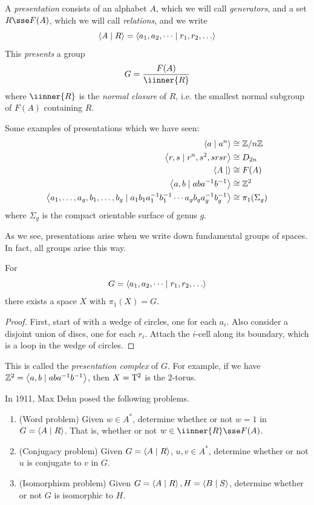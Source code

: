\documentclass{article}
\begin{document}
A \emph{presentation} consists of an alphabet \(A\), which we will call \emph{generators}, and a set \(R \sse F(A)\), which we will call \emph{relations}, and we write
\[\inner{A \mid R} = \inner{a_1, a_2, \dots \mid r_1, r_2, \dots}\]
This \emph{presents}  a group
\[G = \frac{F(A)}{\iinner{R}}\]
where \(\iinner{R}\) is the \emph{normal closure} of \(R\), i.e. the smallest normal subgroup of \(F(A)\) containing \(R\).

\begin{example}
    Some examples of presentations which we have seen:
    \begin{align*}
        \left\langle a \mid a^n \right\rangle &\cong \mathbb{Z}/n\mathbb{Z} \\
        \left\langle r, s \mid r^n, s^2, srsr \right\rangle &\cong D_{2n} \\
        \left\langle A\mid \right\rangle &\cong F(A) \\
        \left\langle a, b \mid aba^{-1}b^{-1} \right\rangle &\cong \mathbb{Z}^2 \\
        \left\langle a_1, \dots, a_g, b_1, \dots, b_g \mid a_1b_1a_1^{-1}b_1^{-1}\cdots a_gb_ga_g^{-1}b_g^{-1} \right\rangle &\cong \pi_1(\Sigma_g)
    \end{align*}
    where \(\Sigma_g\) is the compact orientable surface of genus \(g\).
\end{example}
As we see, presentations arise when we write down fundamental groups of spaces. In fact, all groups arise this way.
\begin{corollary}
    For
    \[G = \inner{a_1, a_2, \dots \mid r_1, r_2, \dots}\]
    there exists a space \(X\) with \(\pi_1(X) = G\).
\end{corollary}

\begin{proof}
    First, start of with a wedge of circles, one for each \(a_i\). Also consider a disjoint union of discs, one for each \(r_i\). Attach the \(i\)-cell along its boundary, which is a loop in the wedge of circles.
\end{proof}

This is called the \emph{presentation complex} of \(G\). For example, if we have \(\mathbb{Z}^2 = \left\langle a, b \mid aba^{-1}b^{-1} \right\rangle\), then \(X = \mathrm{T}^2\) is the \(2\)-torus.

In 1911, Max Dehn posed the following problems.
\begin{enumerate}
    \item (Word problem) Given \(w \in A^*\), determine whether or not \(w = 1\) in \(G = \left\langle A \mid R \right\rangle\). That is, whether or not \(w \in \iinner{R} \sse F(A)\).
    \item (Conjugacy problem) Given \(G = \left\langle A \mid R \right\rangle\), \(u, v \in A^*\), determine whether or not \(u\) is conjugate to \(v\) in \(G\).
    \item (Isomorphism problem) Given \(G = \left\langle A \mid R \right\rangle, H = \left\langle B \mid S \right\rangle\), determine whether or not \(G\) is isomorphic to \(H\).
\end{enumerate}
\end{document}

